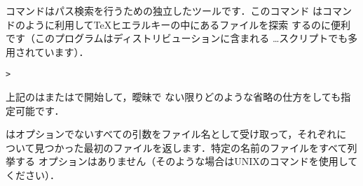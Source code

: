 \documentclass[uplatex,dvipdfmx]{jsarticle}
\begin{document}
コマンドはパス検索を行うための独立したツールです．このコマンド
はコマンドのように利用して\TeX ヒエラルキーの中にあるファイルを探索
するのに便利です（このプログラムはディストリビューションに含まれる%
\dots スクリプトでも多用されています）．
%
\begin{alltt}
> 
\end{alltt}

上記のは\samp{\sopt{}}または\samp{\lopt{}}で開始して，曖昧で
ない限りどのような省略の仕方をしても指定可能です．

\KPS はオプションでないすべての引数をファイル名として受け取って，それぞれに
ついて見つかった最初のファイルを返します．特定の名前のファイルをすべて列挙する
オプションはありません（そのような場合はUNIXのコマンドを使用して
ください）．
\end{document}
